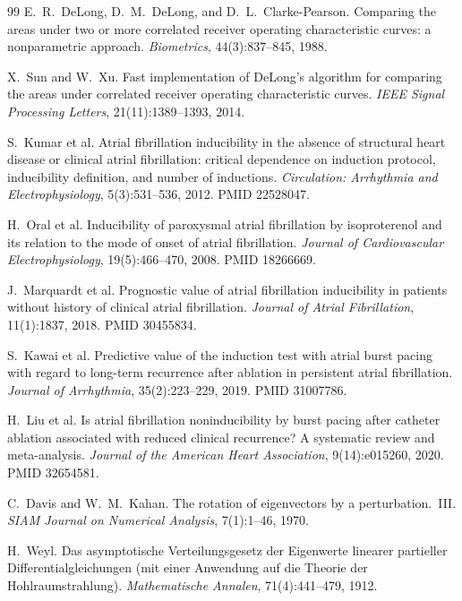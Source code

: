 \documentclass[11pt]{article}
\begin{document}
\begin{thebibliography}{99}
 E.~R.~DeLong, D.~M.~DeLong, and D.~L.~Clarke-Pearson.
Comparing the areas under two or more correlated receiver operating
characteristic curves: a nonparametric approach. \emph{Biometrics},
44(3):837--845, 1988.

 X.~Sun and W.~Xu. Fast implementation of DeLong's algorithm
for comparing the areas under correlated receiver operating characteristic
curves. \emph{IEEE Signal
Processing Letters}, 21(11):1389--1393, 2014.

 S.~Kumar et al. Atrial fibrillation inducibility in the
absence of structural heart disease or clinical atrial fibrillation: critical
dependence on induction protocol, inducibility definition, and number of
inductions. \emph{Circulation: Arrhythmia and Electrophysiology}, 5(3):531--536,
2012. PMID 22528047.

 H.~Oral et al. Inducibility of paroxysmal atrial fibrillation
by isoproterenol and its relation to the mode of onset of atrial fibrillation.
\emph{Journal of Cardiovascular Electrophysiology}, 19(5):466--470, 2008.
PMID 18266669.

 J.~Marquardt et al. Prognostic value of atrial
fibrillation inducibility in patients without history of clinical atrial
fibrillation. \emph{Journal of Atrial Fibrillation}, 11(1):1837, 2018.
PMID 30455834.

 S.~Kawai et al. Predictive value of the induction test with
atrial burst pacing with regard to long-term recurrence after ablation in
persistent atrial fibrillation. \emph{Journal of Arrhythmia}, 35(2):223--229,
2019. PMID 31007786.

 H.~Liu et al. Is atrial fibrillation noninducibility by burst
pacing after catheter ablation associated with reduced clinical recurrence? A
systematic review and meta-analysis. \emph{Journal of the American Heart
Association}, 9(14):e015260, 2020. PMID 32654581.

 C.~Davis and W.~M.~Kahan. The rotation of eigenvectors
by a perturbation.\ III. \emph{SIAM Journal on Numerical Analysis}, 7(1):1--46, 1970.

 H.~Weyl. Das asymptotische Verteilungsgesetz der Eigenwerte
linearer partieller Differentialgleichungen (mit einer Anwendung auf die Theorie
der Hohlraumstrahlung). \emph{Mathematische Annalen},
71(4):441--479, 1912.
\end{thebibliography}
\endgroup
\end{document}
